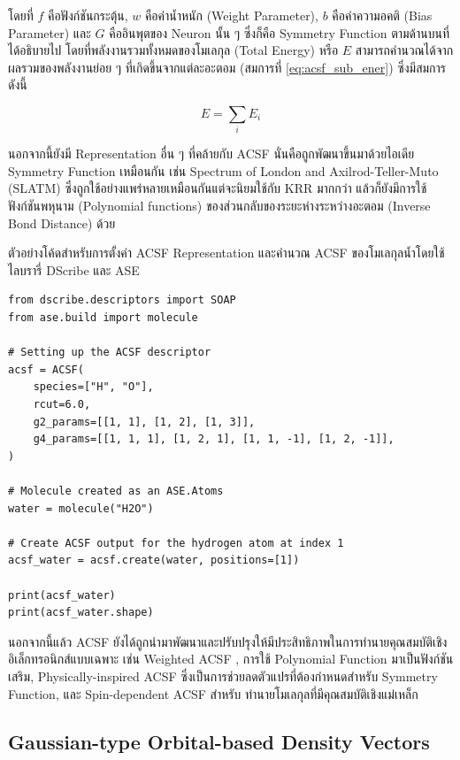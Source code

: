 \noindent โดยที่ $f$ คือฟังก์ชันกระตุ้น, $w$ คือค่าน้ำหนัก (Weight Parameter), $b$ คือค่าความอคติ (Bias Parameter) และ $G$
คืออินพุตของ Neuron นั้น ๆ ซึ่งก็คือ Symmetry Function ตามด้านบนที่ได้อธิบายไป โดยที่พลังงานรวมทั้งหมดของโมเลกุล (Total Energy)
หรือ $E$ สามารถคำนวณได้จากผลรวมของพลังงานย่อย ๆ ที่เกิดขึ้นจากแต่ละอะตอม (สมการที่ \eqref{eq:acsf_sub_ener}) ซึ่งมีสมการดังนี้

\begin{equation}
    E = \sum_{i} E_{i}
\end{equation}

นอกจากนี้ยังมี Representation อื่น ๆ ที่คล้ายกับ ACSF นั่นคือถูกพัฒนาขึ้นมาด้วยไอเดีย Symmetry Function เหมือนกัน เช่น
Spectrum of London and Axilrod-Teller-Muto (SLATM) ซึ่งถูกใช้อย่างแพร่หลายเหมือนกันแต่จะนิยมใช้กับ KRR มากกว่า%
\autocite{faber2018,huang2020} แล้วก็ยังมีการใช้ฟังก์ชันพหุนาม (Polynomial functions) ของส่วนกลับของระยะห่างระหว่างอะตอม
(Inverse Bond Distance) ด้วย\autocite{kwac2019,musil2021}

ตัวอย่างโค้ดสำหรับการตั้งค่า ACSF Representation และคำนวณ ACSF ของโมเลกุลน้ำโดยใช้ไลบรารี่ DScribe และ ASE

\begin{lstlisting}[style=MyPython]
from dscribe.descriptors import SOAP
from ase.build import molecule

# Setting up the ACSF descriptor
acsf = ACSF(
    species=["H", "O"],
    rcut=6.0,
    g2_params=[[1, 1], [1, 2], [1, 3]],
    g4_params=[[1, 1, 1], [1, 2, 1], [1, 1, -1], [1, 2, -1]],
)

# Molecule created as an ASE.Atoms
water = molecule("H2O")

# Create ACSF output for the hydrogen atom at index 1
acsf_water = acsf.create(water, positions=[1])

print(acsf_water)
print(acsf_water.shape)
\end{lstlisting}

\vspace{1em}
นอกจากนี้แล้ว ACSF ยังได้ถูกนำมาพัฒนาและปรับปรุงให้มีประสิทธิภาพในการทำนายคุณสมบัติเชิงอิเล็กทรอนิกส์แบบเฉพาะ เช่น Weighted ACSF%
\autocite{gastegger2018}, การใช้ Polynomial Function มาเป็นฟังก์ชันเสริม\autocite{bircher2021}, Physically-inspired
ACSF\autocite{zhang2021} ซึ่งเป็นการช่วยลดตัวแปรที่ต้องกำหนดสำหรับ Symmetry Function, และ Spin-dependent ACSF สำหรับ%
ทำนายโมเลกุลที่มีคุณสมบัติเชิงแม่เหล็ก\autocite{eckhoff2021}

\subsection{Gaussian-type Orbital-based Density Vectors}
\label{ssec:gauss_orb_den}

